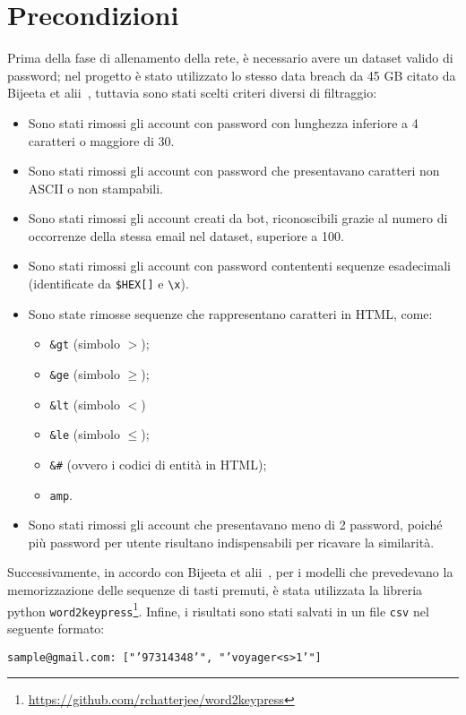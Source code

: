 \section{Precondizioni}
\label{sec:precondizioni}
Prima della fase di allenamento della rete, è necessario avere un dataset valido di password; nel progetto è stato utilizzato lo stesso data breach da 45 GB citato da Bijeeta et alii~\cite{bijeeta}, tuttavia sono stati scelti criteri diversi di filtraggio:
\begin{itemize}
    \item Sono stati rimossi gli account con password con lunghezza inferiore a 4 caratteri o maggiore di 30.
    \item Sono stati rimossi gli account con password che presentavano caratteri non ASCII o non stampabili.
    \item Sono stati rimossi gli account creati da bot, riconoscibili grazie al numero di occorrenze della stessa email nel dataset, superiore a 100.
    \item Sono stati rimossi gli account con password contententi sequenze esadecimali (identificate da \texttt{\$HEX[]} e \texttt{\textbackslash x}).
    \item Sono state rimosse sequenze che rappresentano caratteri in HTML, come:
    \begin{itemize}
        \item \texttt{\&gt} (simbolo $>$);
        \item \texttt{\&ge} (simbolo $\geq$);
        \item \texttt{\&lt} (simbolo $<$)
        \item \texttt{\&le} (simbolo $\leq$);
        \item \texttt{\&\#} (ovvero i codici di entità in HTML);
        \item \texttt{amp}.
    \end{itemize}
    \item Sono stati rimossi gli account che presentavano meno di 2 password, poiché più password per utente risultano indispensabili per ricavare la similarità.
\end{itemize}
Successivamente, in accordo con Bijeeta et alii~\cite{bijeeta}, per i modelli che prevedevano la memorizzazione delle sequenze di tasti premuti, è stata utilizzata la libreria python \texttt{word2keypress}\footnote{\url{https://github.com/rchatterjee/word2keypress}}.
Infine, i risultati sono stati salvati in un file \texttt{csv} nel seguente formato:
\begin{center}
    \texttt{sample@gmail.com: ["'97314348'", "'voyager<s>1'"]}
\end{center}


